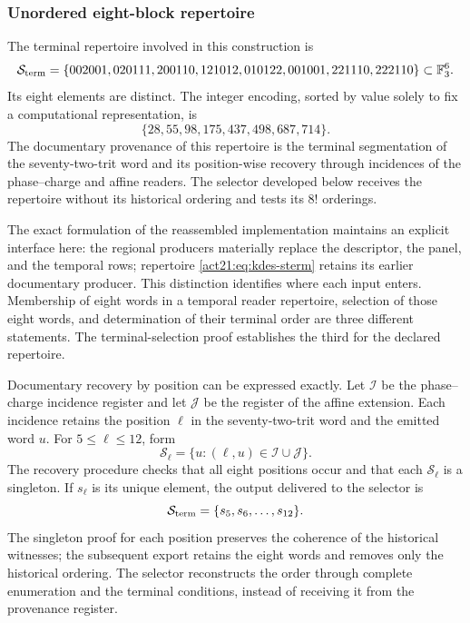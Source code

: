 \subsubsection{Unordered eight-block repertoire}

The terminal repertoire involved in this construction is
\begin{equation}
 \mathcal S_{\rm term}=
 \{002001,020111,200110,121012,
   010122,001001,221110,222110\}\subset\mathbb F_3^6.
 \label{act21:eq:kdes-sterm}
\end{equation}
Its eight elements are distinct. The integer encoding, sorted by
value solely to fix a computational representation, is
\[
 \{28,55,98,175,437,498,687,714\}.
\]
The documentary provenance of this repertoire is the terminal segmentation
of the seventy-two-trit word and its position-wise recovery
through incidences of the phase--charge and affine readers. The selector
developed below receives the repertoire without its historical
ordering and tests its $8!$ orderings.

The exact formulation of the reassembled implementation maintains an
explicit interface here: the regional producers materially replace
the descriptor, the panel, and the temporal rows; repertoire
\eqref{act21:eq:kdes-sterm} retains its earlier documentary producer. This
distinction identifies where each input enters. Membership of
eight words in a temporal reader repertoire, selection of those
eight words, and determination of their terminal order are three
different statements. The terminal-selection proof establishes the
third for the declared repertoire.

Documentary recovery by position can be expressed
exactly. Let $\mathcal I$ be the phase--charge incidence register and let
$\mathcal J$ be the register of the affine extension. Each incidence retains
the position $\ell$ in the seventy-two-trit word and the
emitted word $u$. For $5\leq\ell\leq12$, form
\[
 \mathcal S_\ell=
 \{u:(\ell,u)\in\mathcal I\cup\mathcal J\}.
\]
The recovery procedure checks that all eight positions occur and that each
$\mathcal S_\ell$ is a singleton. If $s_\ell$ is its unique element,
the output delivered to the selector is
\[
 \mathcal S_{\rm term}=\{s_5,s_6,\ldots,s_{12}\}.
\]
The singleton proof for each position preserves the coherence of the
historical witnesses; the subsequent export retains the eight
words and removes only the historical ordering. The selector
reconstructs the order through complete enumeration and the terminal
conditions, instead of receiving it from the provenance register.

